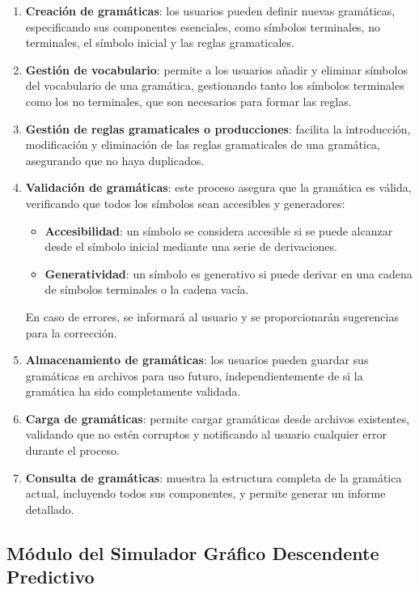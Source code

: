\begin{enumerate}
    \item \textbf{Creación de gramáticas}: los usuarios pueden definir nuevas gramáticas, especificando sus componentes esenciales, como símbolos terminales, no terminales, el símbolo inicial y las reglas gramaticales.
    \item \textbf{Gestión de vocabulario}: permite a los usuarios añadir y eliminar símbolos del vocabulario de una gramática, gestionando tanto los símbolos terminales como los no terminales, que son necesarios para formar las reglas.
    \item \textbf{Gestión de reglas gramaticales o producciones}: facilita la introducción, modificación y eliminación de las reglas gramaticales de una gramática, asegurando que no haya duplicados.
    \item \textbf{Validación de gramáticas}: este proceso asegura que la gramática es válida, verificando que todos los símbolos sean accesibles y generadores:
    \begin{itemize}
        \item \textbf{Accesibilidad}: un símbolo se considera accesible si se puede alcanzar desde el símbolo inicial mediante una serie de derivaciones.
        \item \textbf{Generatividad}: un símbolo es generativo si puede derivar en una cadena de símbolos terminales o la cadena vacía.
    \end{itemize}
    
    En caso de errores, se informará al usuario y se proporcionarán sugerencias para la corrección.
    \item \textbf{Almacenamiento de gramáticas}: los usuarios pueden guardar sus gramáticas en archivos para uso futuro, independientemente de si la gramática ha sido completamente validada.
    \item \textbf{Carga de gramáticas}: permite cargar gramáticas desde archivos existentes, validando que no estén corruptos y notificando al usuario  cualquier error durante el proceso.
    \item \textbf{Consulta de gramáticas}: muestra la estructura completa de la gramática actual, incluyendo todos sus componentes, y permite generar un informe detallado.
\end{enumerate}

\subsection{Módulo del Simulador Gráfico Descendente Predictivo}

